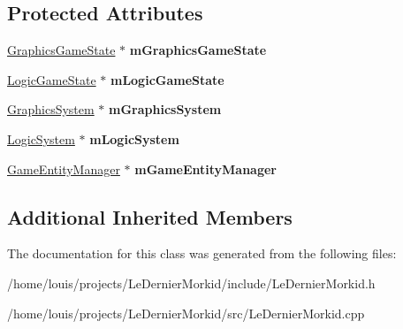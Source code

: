 \subsection*{Protected Attributes}
\begin{DoxyCompactItemize}
\item 
\mbox{\label{class_le_dernier_morkid_a23be96bb6393f265e43dfb8f264437ae}} 
\hyperlink{class_graphics_game_state}{Graphics\+Game\+State} $\ast$ {\bfseries m\+Graphics\+Game\+State}
\item 
\mbox{\label{class_le_dernier_morkid_af8d20b6c7fab7adcc3d2abadc26fe37d}} 
\hyperlink{class_logic_game_state}{Logic\+Game\+State} $\ast$ {\bfseries m\+Logic\+Game\+State}
\item 
\mbox{\label{class_le_dernier_morkid_a45fcb3ad212fe7736cb5760e2c33c6e6}} 
\hyperlink{class_common_1_1_graphics_system}{Graphics\+System} $\ast$ {\bfseries m\+Graphics\+System}
\item 
\mbox{\label{class_le_dernier_morkid_abdf1e8dbee68f3d5aa98f059e0315465}} 
\hyperlink{class_common_1_1_logic_system}{Logic\+System} $\ast$ {\bfseries m\+Logic\+System}
\item 
\mbox{\label{class_le_dernier_morkid_a361bc714a10d219778d4f52d1f8cdb63}} 
\hyperlink{class_common_1_1_game_entity_manager}{Game\+Entity\+Manager} $\ast$ {\bfseries m\+Game\+Entity\+Manager}
\end{DoxyCompactItemize}
\subsection*{Additional Inherited Members}


The documentation for this class was generated from the following files\+:\begin{DoxyCompactItemize}
\item 
/home/louis/projects/\+Le\+Dernier\+Morkid/include/Le\+Dernier\+Morkid.\+h\item 
/home/louis/projects/\+Le\+Dernier\+Morkid/src/Le\+Dernier\+Morkid.\+cpp\end{DoxyCompactItemize}
